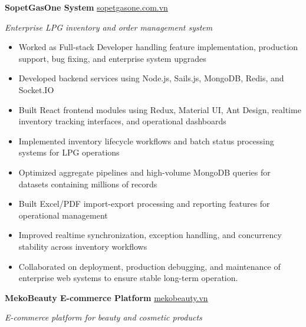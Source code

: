 \documentclass[11pt,a4paper]{article}
\begin{document}
\vspace{8pt}

\textbf{SopetGasOne System}
\hfill
{\small\color{muted}\href{https://truyxuat.sopetgasone.com.vn}{sopetgasone.com.vn}}

{\small\color{muted}\textit{Enterprise LPG inventory and order management system}}

\begin{itemize}

\item Worked as Full-stack Developer handling feature implementation, production support, bug fixing, and enterprise system upgrades

\item Developed backend services using Node.js, Sails.js, MongoDB, Redis, and Socket.IO

\item Built React frontend modules using Redux, Material UI, Ant Design, realtime inventory tracking interfaces, and operational dashboards

\item Implemented inventory lifecycle workflows and batch status processing systems for LPG operations

\item Optimized aggregate pipelines and high-volume MongoDB queries for datasets containing millions of records

\item Built Excel/PDF import-export processing and reporting features for operational management

\item Improved realtime synchronization, exception handling, and concurrency stability across inventory workflows

\item Collaborated on deployment, production debugging, and maintenance of enterprise web systems to ensure stable long-term operation.

\end{itemize}

\vspace{4pt}


\textbf{MekoBeauty E-commerce Platform}
\hfill
{\small\color{muted}\href{https://mekobeauty.vn/}{mekobeauty.vn}}

{\small\color{muted}\textit{E-commerce platform for beauty and cosmetic products}}
\end{document}
